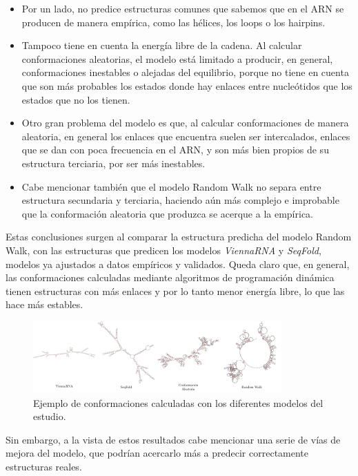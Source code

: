 \documentclass[a4paper,11pt,titlepage]{article}
\theoremstyle{definition}
\begin{document}
\begin{itemize}
    \item Por un lado, no predice estructuras comunes que sabemos que en el ARN se producen de manera empírica, como las hélices, los loops o los hairpins.
    \item Tampoco tiene en cuenta la energía libre de la cadena. Al calcular conformaciones aleatorias, el modelo está limitado a producir, en general, conformaciones inestables o alejadas del equilibrio, porque no tiene en cuenta que son más probables los estados donde hay enlaces entre nucleótidos que los estados que no los tienen.
    \item Otro gran problema del modelo es que, al calcular conformaciones de manera aleatoria, en general los enlaces que encuentra suelen ser intercalados, enlaces que se dan con poca frecuencia en el ARN, y son más bien propios de su estructura terciaria, por ser más inestables.
    \item Cabe mencionar también que el modelo Random Walk no separa entre estructura secundaria y terciaria, haciendo aún más complejo e improbable que la conformación aleatoria que produzca se acerque a la empírica.
\end{itemize}

Estas conclusiones surgen al comparar la estructura predicha del modelo Random Walk, con las estructuras que predicen los modelos \textit{ViennaRNA} y \textit{SeqFold}, modelos ya ajustados a datos empíricos y validados. Queda claro que, en general, las conformaciones calculadas mediante algoritmos de programación dinámica tienen estructuras con más enlaces y por lo tanto menor energía libre, lo que las hace más estables. 

\begin{figure}[H]
    \centering
    \includegraphics[width=0.85\textwidth]{images/RNA_conformations.png}
    \caption{Ejemplo de conformaciones calculadas con los diferentes modelos del estudio.}
    \label{fig:RNA_conformations}
\end{figure}

Sin embargo, a la vista de estos resultados cabe mencionar una serie de vías de mejora del modelo, que podrían acercarlo más a predecir correctamente estructuras reales.
\end{document}
